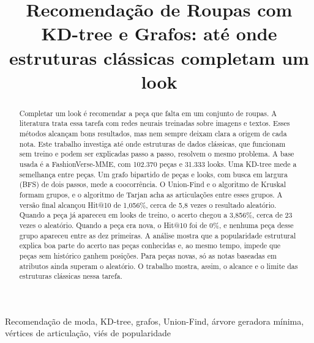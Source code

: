 \documentclass[conference]{IEEEtran}
\begin{document}
\title{Recomendação de Roupas com KD-tree e Grafos: até onde estruturas clássicas completam um look}

\author{
\and
{}
\and
{}
}

\maketitle

\begin{abstract}
Completar um look é recomendar a peça que falta em um conjunto de roupas. A literatura trata essa tarefa com redes neurais treinadas sobre imagens e textos. Esses métodos alcançam bons resultados, mas nem sempre deixam clara a origem de cada nota. Este trabalho investiga até onde estruturas de dados clássicas, que funcionam sem treino e podem ser explicadas passo a passo, resolvem o mesmo problema. A base usada é a FashionVerse-MME, com 102.370 peças e 31.333 looks. Uma KD-tree mede a semelhança entre peças. Um grafo bipartido de peças e looks, com busca em largura (BFS) de dois passos, mede a coocorrência. O Union-Find e o algoritmo de Kruskal formam grupos, e o algoritmo de Tarjan acha as articulações entre esses grupos. A versão final alcançou Hit@10 de 1,056\%, cerca de 5,8 vezes o resultado aleatório. Quando a peça já apareceu em looks de treino, o acerto chegou a 3,856\%, cerca de 23 vezes o aleatório. Quando a peça era nova, o Hit@10 foi de 0\%, e nenhuma peça desse grupo apareceu entre as dez primeiras. A análise mostra que a popularidade estrutural explica boa parte do acerto nas peças conhecidas e, ao mesmo tempo, impede que peças sem histórico ganhem posições. Para peças novas, só as notas baseadas em atributos ainda superam o aleatório. O trabalho mostra, assim, o alcance e o limite das estruturas clássicas nessa tarefa.
\end{abstract}

\begin{IEEEkeywords}
Recomendação de moda, KD-tree, grafos, Union-Find, árvore geradora mínima, vértices de articulação, viés de popularidade
\end{IEEEkeywords}
\end{document}
